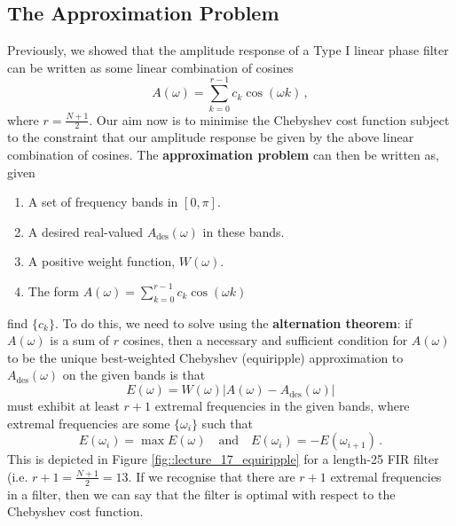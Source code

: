\subsection{The Approximation Problem}
%
Previously, we showed that the amplitude response of a Type I linear
phase filter can be written as some linear combination of cosines 
%
\begin{displaymath}
  A(\omega) = \sum_{k=0}^{r-1}c_k \cos(\omega k) \,,
\end{displaymath}
%
where $r=\frac{N+1}{2}$. Our aim now is to minimise the Chebyshev cost
function subject to the constraint that our amplitude response be
given by the above linear combination of cosines. The
\textbf{approximation problem} can then be written as, given
%
\begin{enumerate}
\item A set of frequency bands in $[0,\pi]$.
\item A desired real-valued $A_\mathrm{des}(\omega)$ in these bands.
\item A positive weight function, $W(\omega)$.
\item The form $A(\omega) = \sum_{k=0}^{r-1}c_k \cos(\omega k)$
\end{enumerate}
%
find $\{c_k\}$. To do this, we need to solve using the
\textbf{alternation theorem}: if $A(\omega)$ is a sum of $r$ cosines,
then a necessary and sufficient condition for $A(\omega)$ to be the
unique best-weighted Chebyshev (equiripple) approximation to
$A_\mathrm{des}(\omega)$ on the given bands is that
%
\begin{displaymath}
  E(\omega) = W(\omega)\lvert A(\omega) - A_\mathrm{des}(\omega) \rvert
\end{displaymath}
%
must exhibit at least $r+1$ extremal frequencies in the given bands,
where extremal frequencies are some $\{\omega_i\}$ such that
%
\begin{displaymath}
  E(\omega_i) = \max E(\omega) \quad\mathrm{and}\quad E(\omega_i) = -E(\omega_{i+1}) \,.
\end{displaymath}
%
This is depicted in Figure \ref{fig::lecture_17_equiripple}
for a length-25 FIR filter (i.e. $r+1 = \frac{N+1}{2} = 13$. If we
recognise that there are $r+1$ extremal frequencies in a filter, then
we can say that the filter is optimal with respect to the Chebyshev
cost function.

